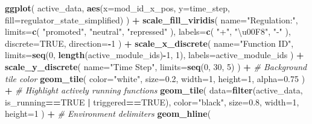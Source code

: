 \documentclass[]{book}
\newenvironment{Shaded}{\begin{snugshade}}{\end{snugshade}}
\newcommand{\CommentTok}[1]{\textcolor[rgb]{0.56,0.35,0.01}{\textit{#1}}}
\newcommand{\DataTypeTok}[1]{\textcolor[rgb]{0.13,0.29,0.53}{#1}}
\newcommand{\DecValTok}[1]{\textcolor[rgb]{0.00,0.00,0.81}{#1}}
\newcommand{\FloatTok}[1]{\textcolor[rgb]{0.00,0.00,0.81}{#1}}
\newcommand{\KeywordTok}[1]{\textcolor[rgb]{0.13,0.29,0.53}{\textbf{#1}}}
\newcommand{\NormalTok}[1]{#1}
\newcommand{\OperatorTok}[1]{\textcolor[rgb]{0.81,0.36,0.00}{\textbf{#1}}}
\newcommand{\OtherTok}[1]{\textcolor[rgb]{0.56,0.35,0.01}{#1}}
\newcommand{\StringTok}[1]{\textcolor[rgb]{0.31,0.60,0.02}{#1}}
\begin{document}
\begin{Shaded}
\begin{Highlighting}[]
\KeywordTok{ggplot}\NormalTok{(}
\NormalTok{    active_data,}
    \KeywordTok{aes}\NormalTok{(}\DataTypeTok{x=}\NormalTok{mod_id_x_pos, }\DataTypeTok{y=}\NormalTok{time_step, }\DataTypeTok{fill=}\NormalTok{regulator_state_simplified)}
\NormalTok{  ) }\OperatorTok{+}
\StringTok{  }\KeywordTok{scale_fill_viridis}\NormalTok{(}
    \DataTypeTok{name=}\StringTok{"Regulation:"}\NormalTok{,}
    \DataTypeTok{limits=}\KeywordTok{c}\NormalTok{(}
      \StringTok{"promoted"}\NormalTok{,}
      \StringTok{"neutral"}\NormalTok{,}
      \StringTok{"repressed"}
\NormalTok{    ),}
    \DataTypeTok{labels=}\KeywordTok{c}\NormalTok{(}
      \StringTok{"+"}\NormalTok{,}
      \StringTok{"\textbackslash{}u00F8"}\NormalTok{,}
      \StringTok{"-"}
\NormalTok{    ),}
    \DataTypeTok{discrete=}\OtherTok{TRUE}\NormalTok{,}
    \DataTypeTok{direction=}\OperatorTok{-}\DecValTok{1}
\NormalTok{  ) }\OperatorTok{+}
\StringTok{  }\KeywordTok{scale_x_discrete}\NormalTok{(}
    \DataTypeTok{name=}\StringTok{"Function ID"}\NormalTok{,}
    \DataTypeTok{limits=}\KeywordTok{seq}\NormalTok{(}\DecValTok{0}\NormalTok{, }\KeywordTok{length}\NormalTok{(active_module_ids)}\OperatorTok{-}\DecValTok{1}\NormalTok{, }\DecValTok{1}\NormalTok{),}
    \DataTypeTok{labels=}\NormalTok{active_module_ids}
\NormalTok{  ) }\OperatorTok{+}
\StringTok{  }\KeywordTok{scale_y_discrete}\NormalTok{(}
    \DataTypeTok{name=}\StringTok{"Time Step"}\NormalTok{,}
    \DataTypeTok{limits=}\KeywordTok{seq}\NormalTok{(}\DecValTok{0}\NormalTok{, }\DecValTok{30}\NormalTok{, }\DecValTok{5}\NormalTok{)}
\NormalTok{  ) }\OperatorTok{+}
\StringTok{  }\CommentTok{# Background tile color}
\StringTok{  }\KeywordTok{geom_tile}\NormalTok{(}
    \DataTypeTok{color=}\StringTok{"white"}\NormalTok{,}
    \DataTypeTok{size=}\FloatTok{0.2}\NormalTok{,}
    \DataTypeTok{width=}\DecValTok{1}\NormalTok{,}
    \DataTypeTok{height=}\DecValTok{1}\NormalTok{,}
    \DataTypeTok{alpha=}\FloatTok{0.75}
\NormalTok{  ) }\OperatorTok{+}
\StringTok{  }\CommentTok{# Highlight actively running functions}
\StringTok{  }\KeywordTok{geom_tile}\NormalTok{(}
    \DataTypeTok{data=}\KeywordTok{filter}\NormalTok{(active_data, is_running}\OperatorTok{==}\OtherTok{TRUE} \OperatorTok{|}\StringTok{ }\NormalTok{triggered}\OperatorTok{==}\OtherTok{TRUE}\NormalTok{),}
    \DataTypeTok{color=}\StringTok{"black"}\NormalTok{,}
    \DataTypeTok{size=}\FloatTok{0.8}\NormalTok{,}
    \DataTypeTok{width=}\DecValTok{1}\NormalTok{,}
    \DataTypeTok{height=}\DecValTok{1}
\NormalTok{  ) }\OperatorTok{+}
\StringTok{  }\CommentTok{# Environment delimiters}
\StringTok{  }\KeywordTok{geom_hline}\NormalTok{(}

\end{Highlighting}
\end{Shaded}
\end{document}
